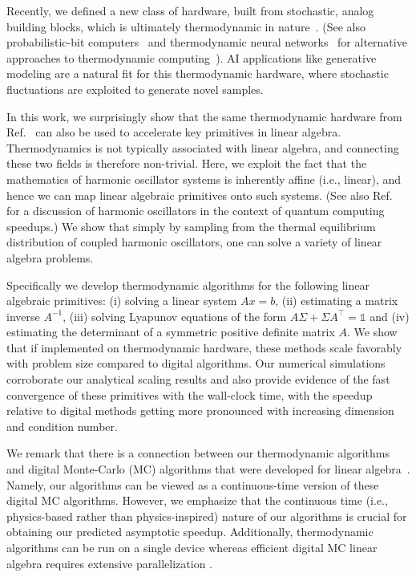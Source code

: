 \documentclass[prx,onecolumn,floatfix,longbibliography,notitlepage, nofootinbib]{revtex4-1}
\begin{document}
Recently, we defined a new class of hardware, built from stochastic, analog building blocks, which is ultimately thermodynamic in nature~\cite{coles2023thermodynamic}. (See also probabilistic-bit computers~\cite{aadit2022massively,Camsari_2019,kaiser2022life} and thermodynamic neural networks~\cite{hylton2020thermodynamic,hylton2022thermodynamic,ganesh2020rebooting,8123676,lipka2023thermodynamic} for alternative approaches to thermodynamic computing~\cite{conte2019thermodynamic}). AI applications like generative modeling are a natural fit for this thermodynamic hardware, where stochastic fluctuations are exploited to generate novel samples. 

In this work, we surprisingly show that the same thermodynamic hardware from Ref.~\cite{coles2023thermodynamic} can also be used to accelerate key primitives in linear algebra. Thermodynamics is not typically associated with linear algebra, and connecting these two fields is therefore non-trivial. 
Here, we exploit the fact that the mathematics of harmonic oscillator systems is inherently affine (i.e., linear), and hence we can map linear algebraic primitives onto such systems. (See also Ref.~\cite{babbush2023exponential} for a discussion of harmonic oscillators in the context of quantum computing speedups.) We show that simply by sampling from the thermal equilibrium distribution of coupled harmonic oscillators, one can solve a variety of linear algebra problems.

 

Specifically we develop thermodynamic algorithms for the following linear algebraic primitives: (i) solving a linear system $Ax = b$, (ii) estimating a matrix inverse $A^{-1}$, (iii) solving Lyapunov equations \cite{parks1992lyapunov} of the form $A\Sigma+ \Sigma A^{\intercal} = \mathds{1}$ and (iv) estimating the determinant of a symmetric positive definite matrix $A$. We show that if implemented on thermodynamic hardware, these methods scale favorably with problem size compared to digital algorithms. Our numerical simulations corroborate our analytical scaling results and also provide evidence of the fast convergence of these primitives with the wall-clock time, with the speedup relative to digital methods getting more pronounced with increasing dimension and condition number.


We remark that there is a connection between our thermodynamic algorithms and digital Monte-Carlo (MC) algorithms that were developed for linear algebra~\cite{forsythe1950matrix,alexandrov1996comparison,okten2005solving,rosca2006monte,dimov2015new}. Namely, our algorithms can be viewed as a continuous-time version of these digital MC algorithms. However, we emphasize that the continuous time (i.e., physics-based rather than physics-inspired) nature of our algorithms is crucial for obtaining our predicted asymptotic speedup. Additionally, thermodynamic algorithms can be run on a single device \cite{duffield2023thermodynamic} whereas efficient digital MC linear algebra requires extensive parallelization \cite{alexandrov1996comparison}.
\end{document}
